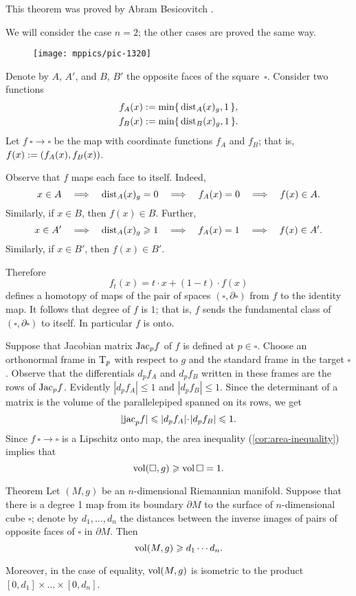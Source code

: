 This theorem was proved by Abram Besicovitch \cite{besicovitch}.

We will consider the case $n=2$; the other cases are proved the same way.

\begin{wrapfigure}{r}{30mm}
\vskip-0mm
\centering
\texttt{[image: mppics/pic-1320]}
\end{wrapfigure}

Denote by $A$, $A'$, and $B$, $B'$ the opposite faces of the square~$\square$.
Consider two functions
\begin{align*}
f_A(x)&\mathrel{:=}\min\{\,\mathrm{dist}_A(x)_g,1\,\},
\\
f_B(x)&\mathrel{:=}\min\{\,\mathrm{dist}_B(x)_g,1\,\}.
\end{align*}
Let $f\:\square\to\square$ be the map with coordinate functions $f_A$ and $f_B$;
that is, $f(x)\mathrel{:=}(f_A(x), f_B(x))$.

Observe that $f$ maps each face to itself.
Indeed, 
\[x\in A \quad\Longrightarrow\quad \mathrm{dist}_A(x)_g=0 \quad\Longrightarrow\quad f_A(x)=0 \quad\Longrightarrow\quad f(x)\in A.\]
Similarly, if $x\in B$, then $f(x)\in B$.
Further, 
\[x\in A'
\quad\Longrightarrow\quad 
\mathrm{dist}_A(x)_g\geqslant 1 
\quad\Longrightarrow\quad 
f_A(x)=1 
\quad\Longrightarrow\quad 
f(x)\in A'.\]
Similarly, if $x\in B'$, then $f(x)\in B'$.

Therefore 
\[f_t(x)= t\cdot x + (1-t)\cdot f(x)\]
defines a homotopy of maps of the pair of spaces $(\square,\partial \square)$ from $f$ to the identity map.
It follows that degree of $f$ is $1$; that is, $f$ sends the fundamental class of $(\square,\partial \square)$ to itself.
In particular $f$ is onto.

Suppose that Jacobian  matrix $\mathrm{Jac}_pf$ of $f$ is defined at $p\in \square$.
Choose an orthonormal frame in $\mathrm{T}_p$ with respect to $g$ and the standard frame in the target $\square$.
Observe that the differentials $d_pf_A$ and $d_pf_B$ written in these frames are the rows of $\mathrm{Jac}_pf$.
Evidently $|d_pf_A|\le 1$ and $|d_pf_B|\le 1$.
Since the determinant of a matrix is the volume of the parallelepiped spanned on its rows, we get 
\[|\jac_p f|\le |d_pf_A|\cdot|d_pf_B|\le 1.\]
Since $f\:\square\to\square$ is a Lipschitz onto map, the area inequality (\ref{cor:area-inequality}) implies that 
\[\operatorname{\rm vol}\nolimits(\square,g)\geqslant \operatorname{\rm vol}\nolimits\square=1.\]
\qedsf


\begin{thm}{Theorem}\label{thm:besikovitch+}
Let $(M,g)$ be an $n$-dimensional Riemannian manifold.
Suppose that there is a degree 1 map from its boundary $\partial M$ to the surface of $n$-dimensional cube $\square$;
denote by $d_1,\dots, d_n$ the distances between the inverse images of pairs of opposite faces of $\square$ in $\partial M$.
Then 
\[\operatorname{\rm vol}\nolimits(M,g)\geqslant d_1\cdots d_n.\]

Moreover, in the case of equality, $\operatorname{\rm vol}\nolimits(M,g)$ is isometric to the product $[0,d_1]\times\dots\times[0,d_n]$.
\end{thm}

